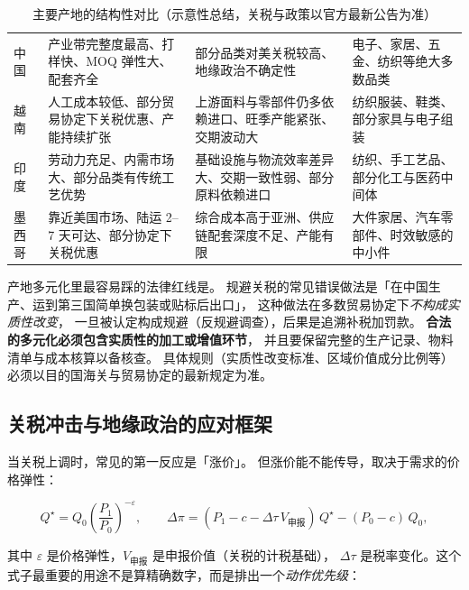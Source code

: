 \begin{table}[htbp]
\centering
\caption{主要产地的结构性对比（示意性总结，关税与政策以官方最新公告为准）}
\label{tab:sup-sourcing}
\small
\begin{tabularx}{\textwidth}{L{1.8cm} L{3.2cm} L{2.9cm} Y}
\toprule
{} &  &  &  \\
\midrule
中国 & 产业带完整度最高、打样快、MOQ 弹性大、配套齐全 & 部分品类对美关税较高、地缘政治不确定性 & 电子、家居、五金、纺织等绝大多数品类 \\
越南 & 人工成本较低、部分贸易协定下关税优惠、产能持续扩张 & 上游面料与零部件仍多依赖进口、旺季产能紧张、交期波动大 & 纺织服装、鞋类、部分家具与电子组装 \\
印度 & 劳动力充足、内需市场大、部分品类有传统工艺优势 & 基础设施与物流效率差异大、交期一致性弱、部分原料依赖进口 & 纺织、手工艺品、部分化工与医药中间体 \\
墨西哥 & 靠近美国市场、陆运 2--7 天可达、部分协定下关税优惠 & 综合成本高于亚洲、供应链配套深度不足、产能有限 & 大件家居、汽车零部件、时效敏感的中小件 \\
\bottomrule
\end{tabularx}
\end{table}

产地多元化里最容易踩的法律红线是。
规避关税的常见错误做法是「在中国生产、运到第三国简单换包装或贴标后出口」，
这种做法在多数贸易协定下\emph{不构成实质性改变}，
一旦被认定构成规避（反规避调查），后果是追溯补税加罚款。
\textbf{合法的多元化必须包含实质性的加工或增值环节}，
并且要保留完整的生产记录、物料清单与成本核算以备核查。
具体规则（实质性改变标准、区域价值成分比例等）必须以目的国海关与贸易协定的最新规定为准。

\subsection{关税冲击与地缘政治的应对框架}

当关税上调时，常见的第一反应是「涨价」。
但涨价能不能传导，取决于需求的价格弹性：

\begin{equation}
Q^{\star} = Q_0\left(\frac{P_1}{P_0}\right)^{-\varepsilon},
\qquad
\Delta\pi = (P_1 - c - \Delta\tau\,V_{\text{申报}})\,Q^{\star} - (P_0 - c)\,Q_0 ,
\label{eq:tariff}
\end{equation}

其中 $\varepsilon$ 是价格弹性，$V_{\text{申报}}$ 是申报价值（关税的计税基础），
$\Delta\tau$ 是税率变化。这个式子最重要的用途不是算精确数字，而是排出一个\emph{动作优先级}：

